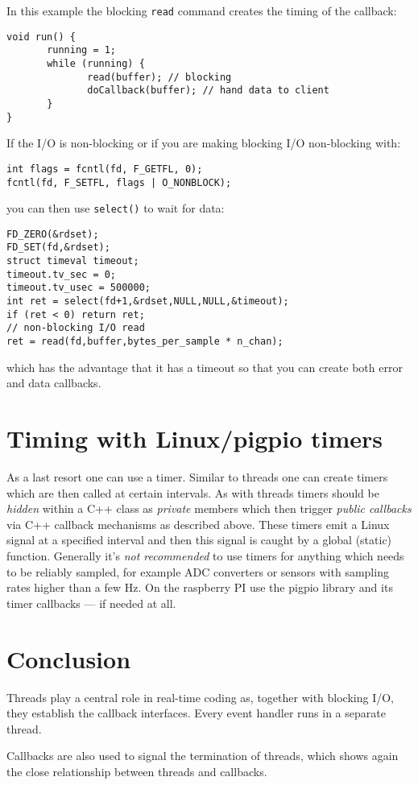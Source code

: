 \documentclass[12pt]{report}
\begin{document}
In this example the blocking \texttt{read} command creates
the timing of the callback:
\begin{verbatim}
void run() {
       running = 1;
       while (running) {
              read(buffer); // blocking
              doCallback(buffer); // hand data to client
       }
}
\end{verbatim}
If the I/O is non-blocking or if you are making blocking I/O non-blocking with:
\begin{verbatim}
int flags = fcntl(fd, F_GETFL, 0);
fcntl(fd, F_SETFL, flags | O_NONBLOCK);
\end{verbatim}
you can then use \texttt{select()} to wait for data:
\begin{verbatim}
FD_ZERO(&rdset);
FD_SET(fd,&rdset);
struct timeval timeout;
timeout.tv_sec = 0;
timeout.tv_usec = 500000;
int ret = select(fd+1,&rdset,NULL,NULL,&timeout);
if (ret < 0) return ret;
// non-blocking I/O read
ret = read(fd,buffer,bytes_per_sample * n_chan);
\end{verbatim}
which has the advantage that it has a timeout so that
you can create both error and data
callbacks.


\section{Timing with Linux/pigpio timers}
As a last resort one can use a timer. Similar to threads one can
create timers which are then called at certain intervals. As with threads
timers should be \textsl{hidden} within a C++ class as
\textsl{private} members which then trigger \textsl{public callbacks}
via C++ callback mechanisms as described above. These timers emit a
Linux signal at a specified interval and then this signal is caught by
a global (static) function.  Generally it's \textsl{not recommended}
to use timers for anything which needs to be reliably sampled, for
example ADC converters or sensors with sampling rates higher than a
few Hz. On the raspberry PI use the pigpio library and its timer
callbacks --- if needed at all.

\section{Conclusion}
Threads play a central role in real-time coding as,
together with blocking I/O, they establish
the callback interfaces. Every event handler
runs in a separate thread.

Callbacks are also used to signal the termination of
threads, which shows again the close relationship between threads
and callbacks.
\end{document}
